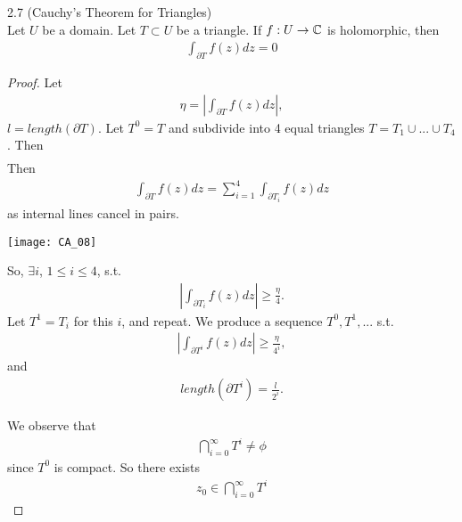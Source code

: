 \documentclass[a4paper]{article}
\begin{document}
\begin{thm} 2.7 (Cauchy's Theorem for Triangles)\\
Let $U$ be a domain. Let $T \subset U$ be a triangle. If $f:U \to \mathbb{C}$ is holomorphic, then
\begin{equation*}
\begin{aligned}
\int_{\partial T} f(z) dz = 0
\end{aligned}
\end{equation*}
\begin{proof}
Let
\begin{equation*}
\begin{aligned}
\eta = \left| \int_{\partial T} f(z) dz\right|,
\end{aligned}
\end{equation*}
$l = length(\partial T)$. Let $T^0 = T$ and subdivide into 4 equal triangles $T = T_1 \cup ... \cup T_4$. Then
\begin{equation*}
\begin{aligned}
\end{aligned}
\end{equation*}
Then
\begin{equation*}
\begin{aligned}
\int_{\partial T} f(z) dz = \sum_{i=1}^4 \int_{\partial T_i} f(z) dz
\end{aligned}
\end{equation*}
as internal lines cancel in pairs.

\texttt{[image: CA\_08]}

So, $\exists i$, $1 \leq i \leq 4$, s.t.
\begin{equation*}
\begin{aligned}
\left|\int_{\partial T_i} f(z) dz\right| \geq \frac{\eta}{4}.
\end{aligned}
\end{equation*}
Let $T^1 = T_i$ for this $i$, and repeat. We produce a sequence $T^0,T^1,...$ s.t.
\begin{equation*}
\begin{aligned}
\left|\int_{\partial T^i} f(z) dz\right| \geq \frac{\eta}{4^i},
\end{aligned}
\end{equation*}
and
\begin{equation*}
\begin{aligned}
length(\partial T^i) =\frac{l}{2^i}.
\end{aligned}
\end{equation*}

We observe that 
\begin{equation*}
\begin{aligned}
\bigcap_{i=0}^\infty T^i \neq \phi
\end{aligned}
\end{equation*}
since $T^0$ is compact. So there exists
\begin{equation*}
\begin{aligned}
z_0 \in \bigcap_{i=0}^\infty T^i
\end{aligned}
\end{equation*}


\end{proof}
\end{thm}
\end{document}
